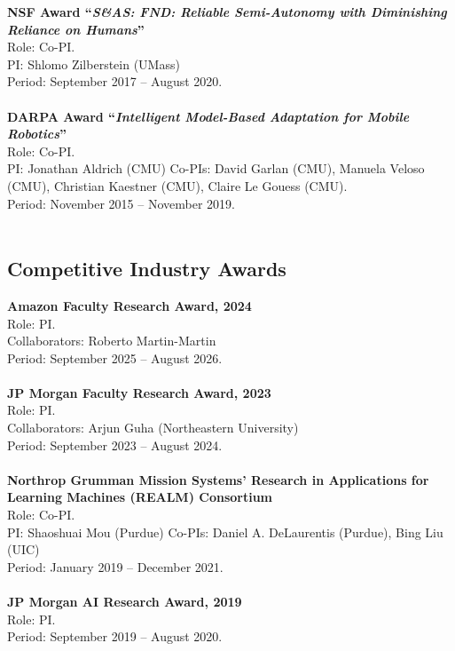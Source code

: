 \documentclass[Times]{article}
\newcommand{\funding}[1]{#1\\}
\renewcommand{\funding}[1]{\\}
\begin{document}
\textbf{NSF Award ``\emph{S\&AS: FND: Reliable Semi-Autonomy with Diminishing Reliance
on Humans}''}\\
Role: Co-PI.\\
PI: Shlomo Zilberstein (UMass)\\
Period: September 2017 -- August 2020.\\
\funding{Total funding: \$699,512.}

\textbf{DARPA Award ``\emph{Intelligent Model-Based Adaptation for Mobile
  Robotics}''}\\
Role: Co-PI.\\
PI: Jonathan Aldrich (CMU)
Co-PIs: David Garlan (CMU), Manuela Veloso
(CMU), Christian Kaestner (CMU), Claire Le Gouess (CMU).\\
Period: November 2015 -- November 2019.\\
\funding{PI Biswas' share: \$377,019.}

\vspace{-1.5em}
\subsection*{Competitive Industry Awards}

\textbf{Amazon Faculty Research Award, 2024}\\
Role: PI.\\
Collaborators: Roberto Martin-Martin\\
Period: September 2025 -- August 2026.\\
\funding{Amount: \$80,000.}

\textbf{JP Morgan Faculty Research Award, 2023}\\
Role: PI.\\
Collaborators: Arjun Guha (Northeastern University)\\
Period: September 2023 -- August 2024.\\
\funding{Amount: \$60,000.}

\textbf{Northrop Grumman Mission Systems’ Research in Applications for Learning Machines (REALM) Consortium}\\
Role: Co-PI.\\
PI: Shaoshuai Mou (Purdue)
Co-PIs: Daniel A. DeLaurentis (Purdue), Bing Liu (UIC)\\
Period: January 2019 -- December 2021.\\
\funding{Total funding: \$1,200,000. PI Biswas' share: \$302,668}

\textbf{JP Morgan AI Research Award, 2019}\\
Role: PI.\\
Period: September 2019 -- August 2020.\\
\funding{Amount: \$147,424.}
\end{document}
